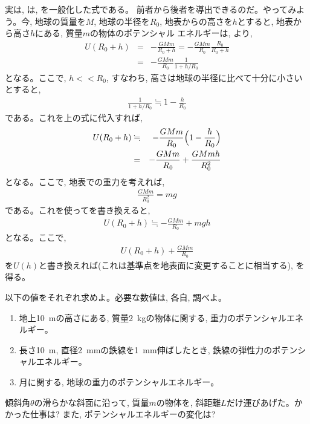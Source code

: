 実は, は, を一般化した式である。
前者から後者を導出できるのだ。やってみよう。今, 地球の質量を$M$, 地球の半径を$R_0$, 
地表からの高さを$h$とすると, 地表から高さ$h$にある, 質量$m$の物体のポテンシャル
エネルギーは, より, 
\begin{eqnarray}
U(R_0+h)&=&-\frac{GMm}{R_0+h}
=-\frac{GMm}{R_0}\frac{R_0}{R_0+h}\nonumber\\
&=&-\frac{GMm}{R_0}\frac{1}{1+h/R_0}
\end{eqnarray}
となる。ここで, $h<<R_0$, すなわち, 高さは地球の半径に比べて十分に小さいとすると, 
\begin{eqnarray}
\frac{1}{1+h/R_0}\fallingdotseq 1-\frac{h}{R_0}
\end{eqnarray}
である。これを上の式に代入すれば, 
\begin{eqnarray}
U(R_0+h)&\fallingdotseq&-\frac{GMm}{R_0}\Bigl(1-\frac{h}{R_0}\Bigr)\nonumber\\
&=&-\frac{GMm}{R_0}+\frac{GMmh}{R_0^2}\label{eq:pot_grav_approx_08}
\end{eqnarray}
となる。ここで, 地表での重力を考えれば, 
\begin{eqnarray}
\frac{GMm}{R_0^2}=mg
\end{eqnarray}
である。これを使ってを書き換えると, 
\begin{eqnarray}
U(R_0+h)\fallingdotseq-\frac{GMm}{R_0}+mgh\label{eq:pot_grav_approx_09}
\end{eqnarray}
となる。ここで, 
\begin{eqnarray}
U(R_0+h)+\frac{GMm}{R_0}
\end{eqnarray}
を$U(h)$と書き換えれば(これは基準点を地表面に変更することに相当する), を得る。\\

\begin{q}\label{q:potential_etc}
以下の値をそれぞれ求めよ。必要な数値は, 各自, 調べよ。
\begin{enumerate}
\item 地上10~mの高さにある, 質量2~kgの物体に関する, 重力のポテンシャルエネルギー。
\item 長さ10~m, 直径2~mmの鉄線を1~mm伸ばしたとき, 鉄線の弾性力のポテンシャルエネルギー。
\item 月に関する, 地球の重力のポテンシャルエネルギー。
\end{enumerate}
\end{q}
\mv

\begin{q}\label{q:slope_lift_energy1}
傾斜角$\theta$の滑らかな斜面に沿って, 質量$m$の物体を, 斜距離$L$だけ運びあげた。かかった仕事は? 
また, ポテンシャルエネルギーの変化は? 
\end{q}
\mv

